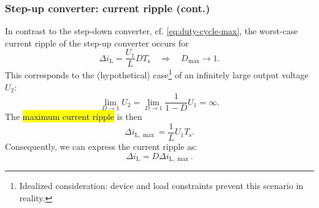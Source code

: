 \begin{frame}
	\frametitle{Step-up converter: current ripple (cont.)}
	In contrast to the step-down converter, cf. \eqref{eq:duty-cycle-max}, the worst-case current ripple of the step-up converter occurs for
	\begin{equation}
		\Delta i_\mathrm{L} =  \frac{U_1}{L}DT_\mathrm{s} \quad \Rightarrow \quad D_\mathrm{max} \rightarrow 1.
		\label{eq:ripple-current-duty-cycle-max-step-up_converter}
	\end{equation}\pause
	This corresponds to the (hypothetical) case\footnote{Idealized consideration: device and load constraints prevent this scenario in reality.} of an infinitely large output voltage $U_2$:
	\begin{equation}
		\lim_{D\rightarrow1}U_2 = \lim_{D\rightarrow1} \frac{1}{1-D}U_1=\infty.
	\end{equation}\pause
	The \hl{maximum current ripple} is then
	\begin{equation}
		\Delta i_\mathrm{L,\max} = \frac{1}{L}U_1T_\mathrm{s}.
		\label{eq:current-ripple-max-step-up}
	\end{equation}\pause
	Consequently, we can express the current ripple as:
	\begin{equation}
		\Delta i_\mathrm{L} = D \Delta i_\mathrm{L,\max}.
	\end{equation}
\end{frame}


